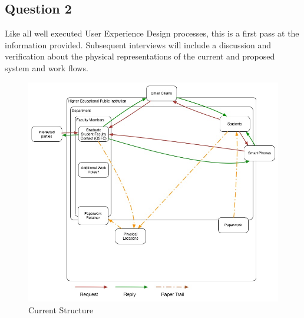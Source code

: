 \documentclass[11pt]{article}
\begin{document}
  \subsection*{Question 2}
  Like all well executed User Experience Design processes, this is a first pass at the information provided.
  Subsequent interviews will include a discussion and verification about the physical representations of the current and proposed system and work flows.
  \begin{figure}[H]
  \centering
  \includegraphics[height=0.9\linewidth]{img/workflow.jpg}
  \caption{Current Structure}
  \label{fig:current}
  \end{figure}
\end{document}
